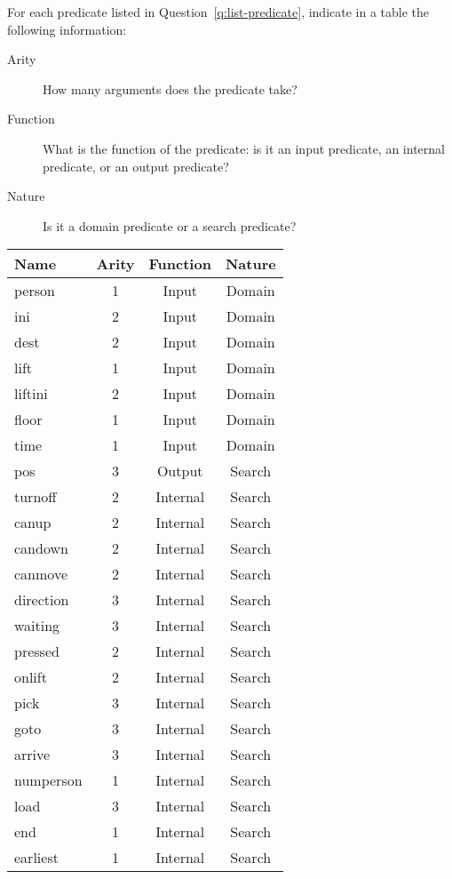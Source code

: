 \documentclass{article}
\begin{document}
\begin{Question}[Overview]
\begin{Subquestion}
\begin{answer}
\end{answer}
\begin{markingguide}
\end{markingguide}
\end{Subquestion}
\begin{Subquestion}
For each predicate listed in Question~\ref{q:list-predicate}, indicate in a table the following information:
\begin{description}
\item[Arity] How many arguments does the predicate take?
\item[Function] What is the function of the predicate: is it an input predicate, an internal predicate, or an output predicate?
\item[Nature] Is it a domain predicate or a search predicate?
\end{description}
\begin{answer}
\centering
\begin{tabular}{lccc}
\toprule
Name & Arity & Function & Nature \\
\midrule
person & 1 & Input & Domain \\
ini & 2 & Input & Domain \\
dest & 2 & Input & Domain \\
lift & 1 & Input & Domain \\ 
liftini & 2 & Input & Domain \\
floor & 1 & Input & Domain \\ 
time & 1 & Input & Domain \\ 
pos & 3 & Output & Search \\ 
turnoff & 2 & Internal & Search \\ 
canup & 2 & Internal & Search \\ 
candown & 2 & Internal & Search \\ 
canmove & 2 & Internal & Search \\ 
direction & 3 & Internal & Search \\ 
waiting & 3 & Internal & Search \\ 
pressed & 2 & Internal & Search \\ 
onlift & 2 & Internal & Search \\ 
pick & 3 & Internal & Search \\ 
goto & 3 & Internal & Search \\ 
arrive & 3 & Internal & Search \\ 
numperson & 1 & Internal & Search \\ 
load & 3 & Internal & Search \\ 
end & 1 & Internal & Search \\ 
earliest & 1 & Internal & Search \\ 
\bottomrule
\end{tabular}
\end{answer}
\begin{markingguide}
\end{markingguide}
\end{Subquestion}
\end{Question}
\end{document}
